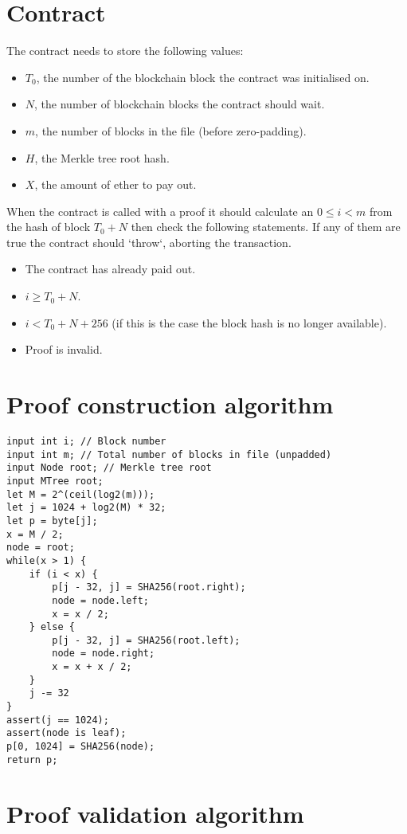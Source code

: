 \documentclass[oneside]{article}
\begin{document}
\section{Contract}

The contract needs to store the following values:
\begin{itemize}
\item $T_0$, the number of the blockchain block the contract was initialised on.
\item $N$, the number of blockchain blocks the contract should wait.
\item $m$, the number of blocks in the file (before zero-padding).
\item $H$, the Merkle tree root hash.
\item $X$, the amount of ether to pay out.
\end{itemize}

When the contract is called with a proof it should calculate an $0 \leq i < m$ from the hash of block $T_0 + N$ then check the following statements.
If any of them are true the contract should `throw`, aborting the transaction.
\begin{itemize}
\item The contract has already paid out.
\item $i \geq T_0 + N$. 
\item $i < T_0 + N + 256$ (if this is the case the block hash is no longer available).
\item Proof is invalid.
\end{itemize}


\section{Proof construction algorithm}

\begin{verbatim}
input int i; // Block number
input int m; // Total number of blocks in file (unpadded)
input Node root; // Merkle tree root
input MTree root;
let M = 2^(ceil(log2(m)));
let j = 1024 + log2(M) * 32;
let p = byte[j];
x = M / 2;
node = root;
while(x > 1) {
    if (i < x) {
        p[j - 32, j] = SHA256(root.right);
        node = node.left;
        x = x / 2;
    } else {
        p[j - 32, j] = SHA256(root.left);
        node = node.right;
        x = x + x / 2;
    }
    j -= 32
}
assert(j == 1024);
assert(node is leaf);
p[0, 1024] = SHA256(node);
return p;
\end{verbatim}

\section{Proof validation algorithm}
\end{document}
